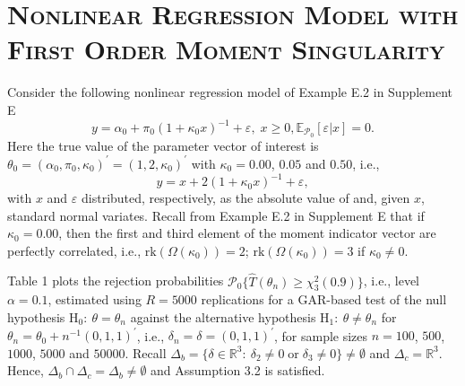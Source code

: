 \documentclass[hidelinks, 11 pt, a4paper, pdflatex]{article}
\renewcommand{\thepage}{}
\begin{document}
{\vspace*{-\baselineskip} %
\vspace*{-\baselineskip} %




 \section{\textsc{Nonlinear Regression Model with First Order Moment Singularity}} \label{Simulation:nonlin.regrn.foms}

  \setcounter{page}{1}
  \renewcommand{\thepage}{[S.\arabic{page}]}

  \indent Consider the following nonlinear regression model of Example E.2 in Supplement E
   \begin{equation*}
    y = \alpha_0 + \pi_0(1 + \kappa_0 x)^{-1} + \varepsilon, \; x \geq 0, \mathbb{E}_{\mathcal{P}_0}[\varepsilon|x] = 0.
   \end{equation*}
  Here the true value of the parameter vector of interest is $\theta_0 = (\alpha_0,\pi_0,\kappa_0)^{\prime} = (1,2,\kappa_0)^{\prime}$ with $\kappa_0 = 0.00$, $0.05$ and $0.50$, i.e.,
	\begin{equation*}
     y = x + 2(1 + \kappa_0 x)^{-1} + \varepsilon,
    \end{equation*}
  with $x$ and $\varepsilon$ distributed, respectively, as the absolute value of and, given $x$, standard normal variates. Recall from Example E.2 in Supplement E that if $\kappa_0 = 0.00$, then the first and third element of the moment indicator vector are perfectly correlated, i.e., $\mathrm{rk}(\Omega(\kappa_0)) = 2$; $\mathrm{rk}(\Omega(\kappa_0)) = 3$ if $\kappa_0 \neq 0$.

  Table 1 plots the rejection probabilities $\mathcal{P}_0\{\hat{T}(\theta_{n}) \geq \chi_{3}^2(0.9)\}$, i.e., level $\alpha = 0.1$, estimated using $R =5000$ replications for a GAR-based test of the null hypothesis $\mathrm{H}_0:~\theta = \theta_{n}$ against the alternative hypothesis $\mathrm{H}_1:~\theta \neq \theta_{n}$ for $\theta_{n} = \theta_0 + n^{-1}(0,1,1)^{\prime}$, i.e., $\delta_n = \delta = (0,1,1)^{\prime}$, for sample sizes $n = 100$, $500$, $1000$, $5000$ and $50000$. Recall $\Delta_b = \{\delta \in \mathbb{R}^3:~\delta_2 \neq 0 \; \text{or} \; \delta_3 \neq 0\} \neq \emptyset$ and $\Delta_c = \mathbb{R}^3$. Hence, $\Delta_b \cap \Delta_c = \Delta_b \neq \emptyset$ and Assumption 3.2 is satisfied.
	
}
\end{document}

